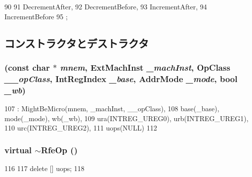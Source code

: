 \begin{DoxyCode}
90                   {
91         DecrementAfter,
92         DecrementBefore,
93         IncrementAfter,
94         IncrementBefore
95     };
\end{DoxyCode}


\subsection{コンストラクタとデストラクタ}
\hypertarget{classArmISA_1_1RfeOp_a2379b1991207f7cc821855a9a8057305}{
\subsubsection[{RfeOp}]{ (const char $\ast$ {\em mnem}, \/  {\bf ExtMachInst} {\em \_\-machInst}, \/  OpClass {\em \_\-\_\-opClass}, \/  {\bf IntRegIndex} {\em \_\-base}, \/  {\bf AddrMode} {\em \_\-mode}, \/  bool {\em \_\-wb})}}
\label{classArmISA_1_1RfeOp_a2379b1991207f7cc821855a9a8057305}



\begin{DoxyCode}
107         : MightBeMicro(mnem, _machInst, __opClass),
108           base(_base), mode(_mode), wb(_wb),
109           ura(INTREG_UREG0), urb(INTREG_UREG1),
110           urc(INTREG_UREG2),
111           uops(NULL)
112     {}
\end{DoxyCode}
\hypertarget{classArmISA_1_1RfeOp_ad15b456953baa96c091d58d121c183b7}{
\subsubsection[{$\sim$RfeOp}]{\setlength{\rightskip}{0pt plus 5cm}virtual $\sim${\bf RfeOp} ()}}
\label{classArmISA_1_1RfeOp_ad15b456953baa96c091d58d121c183b7}



\begin{DoxyCode}
116     {
117         delete [] uops;
118     }
\end{DoxyCode}


